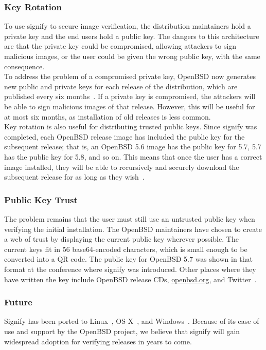 \documentclass[conference]{IEEEtran}
\begin{document}
\subsubsection{Key Rotation}
To use signify to secure image verification, the distribution maintainers hold a private
key and the end users hold a public key. The dangers to this architecture are that the
private key could be compromised, allowing attackers to sign malicious images, or the user
could be given the wrong public key, with the same consequence.\\
\indent To address the problem of a compromised private key, OpenBSD now generates new
public and private keys for each release of the distribution, which are published every
six months~\cite{openbsdrelease}. If a private key is compromised, the attackers will be able
to sign malicious images of that release. However, this will be useful for at most six months,
as installation of old releases is less common.\\
\indent Key rotation is also useful for distributing trusted public keys. Since signify was
completed, each OpenBSD release image has included the public key for the subsequent release;
that is, an OpenBSD 5.6 image has the public key for 5.7, 5.7 has the public key for 5.8, and
so on. This means that once the user has a correct image installed, they will be able to
recursively and securely download the subsequent release for as long as they wish~\cite{signify}.
\subsubsection{Public Key Trust\label{publickeytrust}}
The problem remains that the user must still use an untrusted public key when verifying the
initial installation. The OpenBSD maintainers have chosen to create a web of trust by displaying
the current public key wherever possible. The current keys fit in 56 base64-encoded characters,
which is small enough to be converted into a QR code. The public key for OpenBSD 5.7 was shown
in that format at the conference where signify was introduced. Other places where they have
written the key include OpenBSD release CDs, \url{openbsd.org}, and Twitter~\cite{signify}.
\subsubsection{Future}
Signify has been ported to Linux~\cite{signifylinux}, OS X~\cite{signifyosx}, and
Windows~\cite{signifywindows}. Because of its ease of use and support by the OpenBSD project,
we believe that signify will gain widespread adoption for verifying releases in years to come. 
\end{document}
